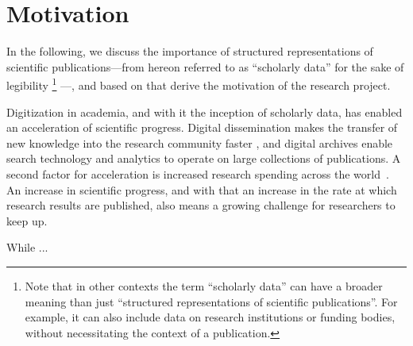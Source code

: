 

\section{Motivation}


In the following, we discuss the importance of structured representations of scientific publications---from hereon referred to as ``scholarly data'' for the sake of legibility%
\footnote{Note that in other contexts the term ``scholarly data'' can have a broader meaning than just ``structured representations of scientific publications''. For example, it can also include data on research institutions or funding bodies, without necessitating the context of a publication.}%
---, and based on that derive the motivation of the research project.

Digitization in academia, and with it the inception of scholarly data, has enabled an acceleration of scientific progress. Digital dissemination makes the transfer of new knowledge into the research community faster%
, and digital archives enable search technology and analytics to operate on large collections of publications. A second factor for acceleration is increased research spending across the world~\cite{CRS2022,OECD2023}. An increase in scientific progress, and with that an increase in the rate at which research results are published, also means a growing challenge for researchers to keep up.

While ...

